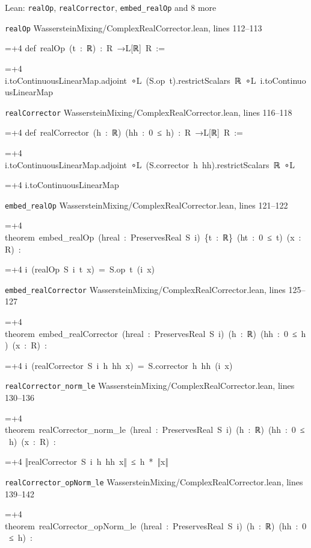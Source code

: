 \documentclass[11pt,a4paper]{article}
\newlength{\leancharwidth}
\newenvironment{leancode}{\par\smallskip\begingroup\ttfamily\footnotesize\raggedright
  \settowidth{\leancharwidth}{M}\setlength{\parskip}{0pt}\setlength{\parindent}{0pt}
  \frenchspacing}{\par\endgroup\smallskip}
\newcommand{\leanline}[2]{\hangindent=\dimexpr#1\leancharwidth+4\leancharwidth\relax
  \hangafter=1\noindent\hspace*{#1\leancharwidth}#2\par}
\newcommand{\leansource}[1]{\par{\footnotesize\color{leanmuted}#1}\par}
\begin{document}
\begin{leanbox}{Lean: \texttt{realOp}, \texttt{realCorrector}, \texttt{embed\_\allowbreak{}realOp} and 8 more}
\leansource{\texttt{realOp} \quad WassersteinMixing/\allowbreak{}ComplexRealCorrector.lean, lines 112–113}
\begin{leancode}
\leanline{0}{def\ realOp\ (t\ :\ ℝ)\ :\ R\ →L[ℝ]\ R\ :=}
\leanline{2}{i.toContinuousLinearMap.adjoint\ ∘L\ (S.op\ t).restrictScalars\ ℝ\ ∘L\ i.toContinuousLinearMap}
\end{leancode}
\leansource{\texttt{realCorrector} \quad WassersteinMixing/\allowbreak{}ComplexRealCorrector.lean, lines 116–118}
\begin{leancode}
\leanline{0}{def\ realCorrector\ (h\ :\ ℝ)\ (hh\ :\ 0\ ≤\ h)\ :\ R\ →L[ℝ]\ R\ :=}
\leanline{2}{i.toContinuousLinearMap.adjoint\ ∘L\ (S.corrector\ h\ hh).restrictScalars\ ℝ\ ∘L}
\leanline{4}{i.toContinuousLinearMap}
\end{leancode}
\leansource{\texttt{embed\_\allowbreak{}realOp} \quad WassersteinMixing/\allowbreak{}ComplexRealCorrector.lean, lines 121–122}
\begin{leancode}
\leanline{0}{theorem\ embed\_realOp\ (hreal\ :\ PreservesReal\ S\ i)\ \{t\ :\ ℝ\}\ (ht\ :\ 0\ ≤\ t)\ (x\ :\ R)\ :}
\leanline{4}{i\ (realOp\ S\ i\ t\ x)\ =\ S.op\ t\ (i\ x)}
\end{leancode}
\leansource{\texttt{embed\_\allowbreak{}realCorrector} \quad WassersteinMixing/\allowbreak{}ComplexRealCorrector.lean, lines 125–127}
\begin{leancode}
\leanline{0}{theorem\ embed\_realCorrector\ (hreal\ :\ PreservesReal\ S\ i)\ (h\ :\ ℝ)\ (hh\ :\ 0\ ≤\ h)\ (x\ :\ R)\ :}
\leanline{4}{i\ (realCorrector\ S\ i\ h\ hh\ x)\ =\ S.corrector\ h\ hh\ (i\ x)}
\end{leancode}
\leansource{\texttt{realCorrector\_\allowbreak{}norm\_\allowbreak{}le} \quad WassersteinMixing/\allowbreak{}ComplexRealCorrector.lean, lines 130–136}
\begin{leancode}
\leanline{0}{theorem\ realCorrector\_norm\_le\ (hreal\ :\ PreservesReal\ S\ i)\ (h\ :\ ℝ)\ (hh\ :\ 0\ ≤\ h)\ (x\ :\ R)\ :}
\leanline{4}{‖realCorrector\ S\ i\ h\ hh\ x‖\ ≤\ h\ *\ ‖x‖}
\end{leancode}
\leansource{\texttt{realCorrector\_\allowbreak{}opNorm\_\allowbreak{}le} \quad WassersteinMixing/\allowbreak{}ComplexRealCorrector.lean, lines 139–142}
\begin{leancode}
\leanline{0}{theorem\ realCorrector\_opNorm\_le\ (hreal\ :\ PreservesReal\ S\ i)\ (h\ :\ ℝ)\ (hh\ :\ 0\ ≤\ h)\ :}

\end{leancode}
\end{leanbox}
\end{document}
